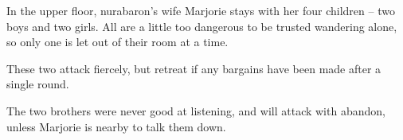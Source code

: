 \begin{multicols}{2}
In the upper floor, \gls{nurabaron}'s wife Marjorie stays with her four children -- two boys and two girls.  All are a little too dangerous to be trusted wandering alone, so only one is let out of their room at a time.


These two attack fiercely, but retreat if any bargains have been made after a single round.

\ogre


The two brothers were never good at listening, and will attack with abandon, unless Marjorie is nearby to talk them down.

\ogre

\end{multicols}

